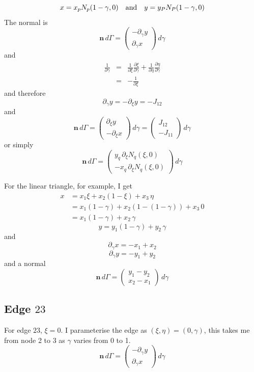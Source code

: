 \documentclass[10pt,a4paper]{book}
\newcommand{\p}{\partial}
\begin{document}
\[
x=x_p N_p(1-\gamma,0) \quad \hbox{and} \quad y=y_P N_P(1-\gamma,0)
\]
The normal is
\[
\bm{n} \, d \Gamma= \left ( \begin{array}{c} -\p_{\gamma} y \\ \p_{\gamma} x \end{array} \right
) \, d \gamma
\]
and
\begin{eqnarray*}
\frac{1}{\p \gamma}&=&\frac{1}{\p \xi} \frac{\p \xi}{\p \gamma} +\frac{1}{\p \eta} \frac{\p \eta}{\p \gamma}\\
&=&-\frac{1}{\p \xi} 
\end{eqnarray*}
and therefore
\[
\p_{\gamma} y=-\p_{\xi} y=-J_{12}
\]
and
\[
\bm{n}\, d \Gamma=
\begin{pmatrix} 
\p_{\xi} y \\
-\p_{\xi} x
\end{pmatrix}
\, d \gamma
=
\begin{pmatrix}
J_{12} \\
-J_{11}
\end{pmatrix}
\, d \gamma
\]
or simply
\[
\bm{n} \, d \Gamma= \left ( \begin{array}{c} y_q \, \p_{\xi} N_q(\xi,0) \\ -x_q \, \p_{\xi} N_q(\xi,0) \end{array} \right
) \, d \gamma
\]


For the linear triangle, for example, I get
\begin{align*}
x&= x_1 \xi + x_2 (1-\xi) + x_3 \,\eta \\
&=x_1 (1-\gamma) + x_2 (1-(1-\gamma)) + x_3 \, 0 \\
&=x_1 (1-\gamma) + x_2 \, \gamma 
\end{align*}
\[
y=y_1 (1-\gamma) + y_2 \,\gamma
\]
and 
\[\p_{\gamma} x= -x_1+x_2 \]
\[\p_{\gamma} y= -y_1+y_2 \]
and a normal
\[
\bm{n} \, d \Gamma
= \left ( \begin{array}{c} y_1 -y_2 \\ x_2 - x_1 \end{array} \right ) \, d \gamma
\]



\subsection{Edge $23$}

For edge $23$, $\xi=0$. I parameterise the edge as $(\xi,\eta)=(0,\gamma)$, this takes me from node 2 to 3 as
$\gamma$ varies from 0 to 1. 
\[
\bm{n} \, d \Gamma= \left ( \begin{array}{c} -\p_{\gamma} y \\ \p_{\gamma} x \end{array} \right ) \,
d \gamma
\]
\end{document}
